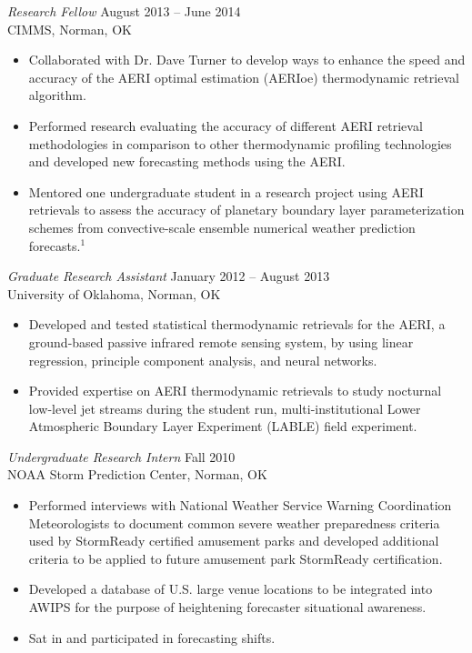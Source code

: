 \documentclass[10pt]{res} %
\begin{document}
\begin{resume}
{\sl Research Fellow} \hfill August 2013 -- June 2014 \\
CIMMS, Norman, OK
\begin{itemize} \itemsep 2pt %
\item Collaborated with Dr. Dave Turner to develop ways to enhance the speed and accuracy of the AERI optimal estimation (AERIoe) thermodynamic retrieval algorithm.
\item Performed research evaluating the accuracy of different AERI retrieval methodologies in comparison to other thermodynamic profiling technologies and developed new forecasting methods using the AERI.
\item Mentored one undergraduate student in a research project using AERI retrievals to assess the accuracy of planetary boundary layer parameterization schemes from convective-scale ensemble numerical weather prediction forecasts.$^{1}$
\end{itemize}

{\sl Graduate Research Assistant} \hfill January 2012 -- August 2013 \\
University of Oklahoma, Norman, OK
\begin{itemize} \itemsep 2pt %
\item Developed and tested statistical thermodynamic retrievals for the AERI, a ground-based passive infrared remote sensing system, by using linear regression, principle component analysis, and neural networks.
\item Provided expertise on AERI thermodynamic retrievals to study nocturnal low-level jet streams during the student run, multi-institutional Lower Atmospheric Boundary Layer Experiment (LABLE) field experiment.
\end{itemize}

{\sl Undergraduate Research Intern} \hfill Fall 2010 \\ 
NOAA Storm Prediction Center, Norman, OK 
\begin{itemize} \itemsep 2pt %
\item Performed interviews with National Weather Service Warning Coordination Meteorologists to document common severe weather preparedness criteria used by StormReady certified amusement parks and developed additional criteria to be applied to future amusement park StormReady certification.
\item Developed a database of U.S. large venue locations to be integrated into AWIPS for the purpose of heightening forecaster situational awareness.
\item Sat in and participated in forecasting shifts.
\end{itemize} 


\end{resume}
\end{document}
